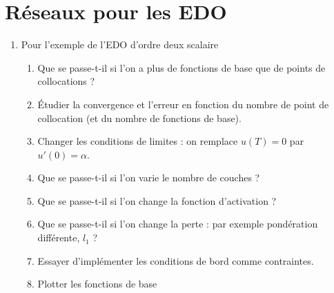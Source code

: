 \documentclass[11pt,a4paper]{article}
\begin{document}
\section{Réseaux pour les EDO}\label{sec:}
%
\begin{enumerate}
\item Pour l'exemple de l'EDO d'ordre deux scalaire
\begin{enumerate}
\item Que se passe-t-il si l'on a plus de fonctions de base que de points de collocations ?
\item Étudier la convergence et l'erreur en fonction du nombre de point de collocation (et du nombre de fonctions de base).
\item Changer les conditions de limites : on remplace $u(T)=0$ par $u'(0)=\alpha$.
\item Que se passe-t-il si l'on varie le nombre de couches ?
\item Que se passe-t-il si l'on change la fonction d'activation ?
\item Que se passe-t-il si l'on change la perte : par exemple pondération différente, $l_1$ ?
\item Essayer d'implémenter les conditions de bord comme contraintes.
\item Plotter les fonctions de base
\end{enumerate}
\end{enumerate}
%
\end{document}
